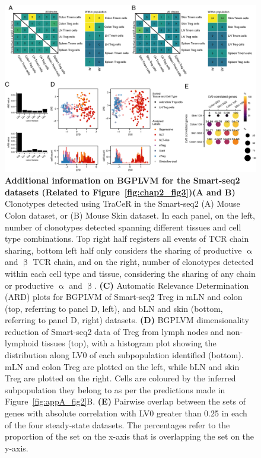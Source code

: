 \begin{figure}[ht!] 
\centering    
\includegraphics[width=1.0\textwidth]{Appendix1/Figs/appA_fig4.png} %
\caption[Additional information on BGPLVM for the Smart-seq2 datasets]{\textbf{Additional information on BGPLVM for the Smart-seq2 datasets (Related to Figure~\ref{fig:chap2_fig3})}\newline\textbf{(A and B)} Clonotypes detected using TraCeR in the Smart-seq2 (A) Mouse Colon dataset, or (B) Mouse Skin dataset. In each panel, on the left, number of clonotypes detected spanning different tissues and cell type combinations. Top right half registers all events of TCR chain sharing, bottom left half only considers the sharing of productive ${\upalpha}$ and ${\upbeta}$ TCR chain, and on the right, number of clonotypes detected within each cell type and tissue, considering the sharing of any chain or productive ${\upalpha}$ and ${\upbeta}$. \textbf{(C)} Automatic Relevance Determination (ARD) plots for BGPLVM of Smart-seq2 Treg in mLN and colon (top, referring to panel D, left), and bLN and skin (bottom, referring to panel D, right) datasets. \textbf{(D)} BGPLVM dimensionality reduction of Smart-seq2 data of Treg from lymph nodes and non-lymphoid tissues (top), with a histogram plot showing the distribution along LV0 of each subpopulation identified (bottom). mLN and colon Treg are plotted on the left, while bLN and skin Treg are plotted on the right. Cells are coloured by the inferred subpopulation they belong to as per the predictions made in Figure~\ref{fig:appA_fig2}B. \textbf{(E)} Pairwise overlap between the sets of genes with absolute correlation with LV0 greater than 0.25 in each of the four steady-state datasets. The percentages refer to the proportion of the set on the x-axis that is overlapping the set on the y-axis.}
\label{fig:appA_fig4}
\end{figure}

